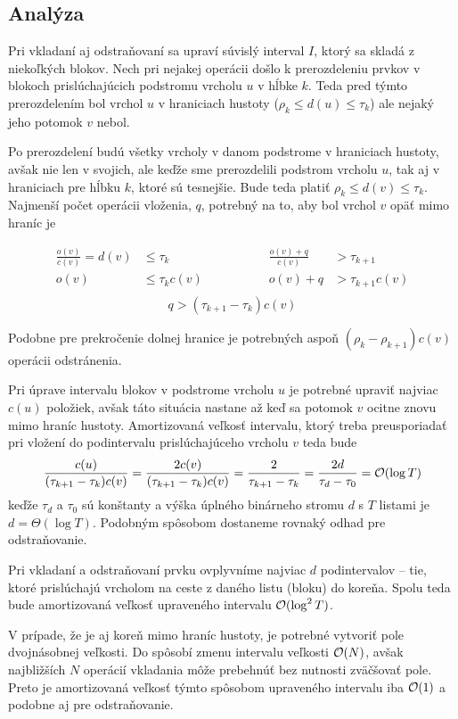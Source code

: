 \subsection{Analýza}

Pri vkladaní aj odstraňovaní sa upraví súvislý interval $I$, ktorý sa skladá z niekoľkých blokov. Nech pri nejakej operácii došlo k prerozdeleniu prvkov v blokoch prislúchajúcich podstromu vrcholu $u$ v hĺbke $k$. Teda pred týmto prerozdelením bol vrchol $u$ v hraniciach hustoty ($\rho_k \le d(u) \le \tau_k$) ale nejaký jeho potomok $v$ nebol.

Po prerozdelení budú všetky vrcholy v danom podstrome v hraniciach hustoty, avšak nie len v svojich, ale keďže sme prerozdelili podstrom vrcholu $u$, tak aj v hraniciach pre hĺbku $k$, ktoré sú tesnejšie. Bude teda platiť $\rho_k \le d(v) \le \tau_k$. Najmenší počet operácii vloženia, $q$, potrebný na to, aby bol vrchol $v$ opäť mimo hraníc je

\[
\begin{aligned}
\frac{o(v)}{c(v)} = d(v) &\le \tau_k \hspace{3cm} & \frac{o(v)+q}{c(v)} &> \tau_{k+1} \\
o(v) &\le \tau_k c(v) & o(v)+q &> \tau_{k+1}c(v) \\
\end{aligned}
\]\[
q > (\tau_{k+1}-\tau_k)c(v)
\]

Podobne pre prekročenie dolnej hranice je potrebných aspoň $(\rho_k-\rho_{k+1})c(v)$ operácii odstránenia.

Pri úprave intervalu blokov v podstrome vrcholu $u$ je potrebné upraviť najviac $c(u)$ položiek, avšak táto situácia nastane až keď sa potomok $v$ ocitne znovu mimo hraníc hustoty. Amortizovaná veľkosť intervalu, ktorý treba preusporiadať pri vložení do podintervalu prislúchajúceho vrcholu $v$ teda bude
\[
\frac{c(u)}{(\tau_{k+1}-\tau_k)c(v)} = \frac{2c(v)}{(\tau_{k+1}-\tau_k)c(v)} = \frac{2}{\tau_{k+1}-\tau_k} = \frac{2d}{\tau_d-\tau_0} = \mathcal{O}(\log{T})
\]
keďže $\tau_d$ a $\tau_0$ sú konštanty a výška úplného binárneho stromu $d$ s $T$ listami je $d = \Theta(\log{T})$. Podobným spôsobom dostaneme rovnaký odhad pre odstraňovanie.

Pri vkladaní a odstraňovaní prvku ovplyvníme najviac $d$ podintervalov -- tie, ktoré prislúchajú vrcholom na ceste z daného listu (bloku) do koreňa. Spolu teda bude amortizovaná veľkosť upraveného intervalu $\mathcal{O}(\log^2{T})$.

V prípade, že je aj koreň mimo hraníc hustoty, je potrebné vytvoriť pole dvojnásobnej veľkosti. Do spôsobí zmenu intervalu veľkosti $\mathcal{O}(N)$, avšak najbližších $N$ operácií vkladania môže prebehnúť bez nutnosti zväčšovať pole. Preto je amortizovaná veľkosť týmto spôsobom upraveného intervalu iba $\mathcal{O}(1)$ a podobne aj pre odstraňovanie.

